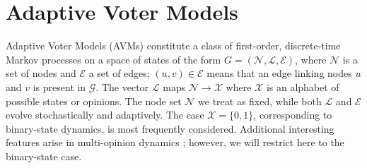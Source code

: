 \documentclass[review, onefignum, onetabnum]{siamart171218}
\begin{document}
\section{Adaptive Voter Models} \label{sec:AVMs}
	
	Adaptive Voter Models (AVMs) constitute a class of first-order, discrete-time Markov processes on a space of states of the form $G = (\mathcal{N}, \mathcal{L}, \mathcal{E})$, where $\mathcal{N}$ is a set of nodes and $\mathcal{E}$ a set of edges; $(u,v) \in \mathcal{E}$ means that an edge linking nodes $u$ and $v$ is present in $\mathcal{G}$.
    The vector $\mathcal{L}$ maps $\mathcal{N} \rightarrow \mathcal{X}$ where $\mathcal{X}$ is an alphabet of possible states or opinions. 
	The node set $\mathcal{N}$ we treat as fixed, while both $\mathcal{L}$ and $\mathcal{E}$ evolve stochastically and adaptively.
	The case $\mathcal{X} = \{0,1\}$, corresponding to binary-state dynamics, is most frequently considered. 
	Additional interesting features arise in multi-opinion dynamics \cite{Holme2006, Shi2013}; however, we will restrict here to the binary-state case. 
	
\end{document}
